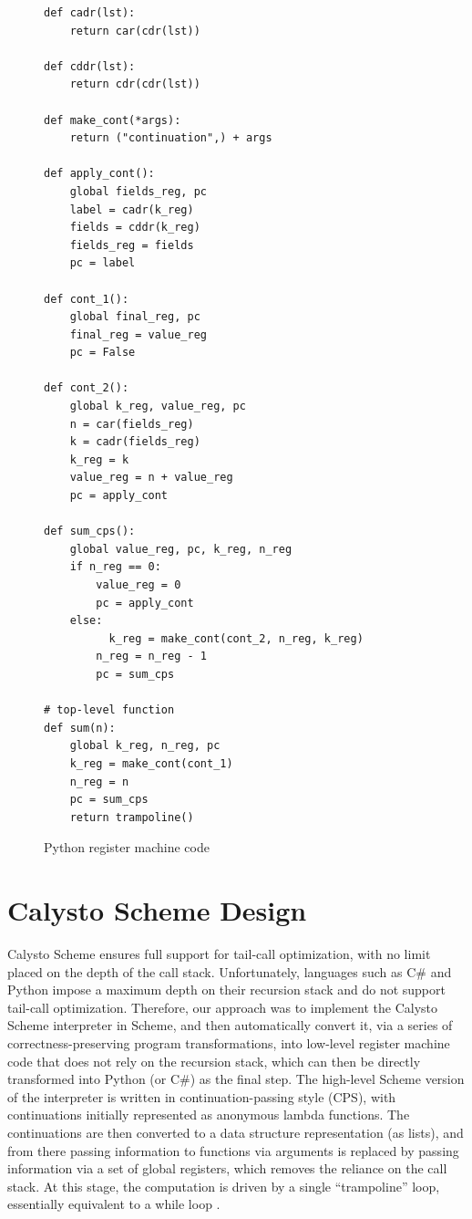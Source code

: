 \documentclass[acmsmall,screen,authorversion]{acmart}
\begin{document}
\begin{figure}
\begin{minipage}{0.4\textwidth}
{\begin{verbatim}
def cadr(lst):
    return car(cdr(lst))

def cddr(lst):
    return cdr(cdr(lst))

def make_cont(*args):
    return ("continuation",) + args

def apply_cont():
    global fields_reg, pc
    label = cadr(k_reg)
    fields = cddr(k_reg)
    fields_reg = fields
    pc = label

def cont_1():
    global final_reg, pc
    final_reg = value_reg
    pc = False

def cont_2():
    global k_reg, value_reg, pc
    n = car(fields_reg)
    k = cadr(fields_reg)
    k_reg = k
    value_reg = n + value_reg
    pc = apply_cont

def sum_cps():
    global value_reg, pc, k_reg, n_reg
    if n_reg == 0:
        value_reg = 0
        pc = apply_cont
    else:
          k_reg = make_cont(cont_2, n_reg, k_reg)
        n_reg = n_reg - 1
        pc = sum_cps

# top-level function
def sum(n):
    global k_reg, n_reg, pc
    k_reg = make_cont(cont_1)
    n_reg = n
    pc = sum_cps
    return trampoline()
\end{verbatim}
}
\caption{Python register machine code}
\label{fig:pythonRM}
\end{minipage}
\end{figure}


\section{Calysto Scheme Design}

Calysto Scheme ensures full support for tail-call optimization, with no limit
placed on the depth of the call stack.  Unfortunately, languages such as C\#
and Python impose a maximum depth on their recursion stack and do not support
tail-call optimization.  Therefore, our approach was to implement the Calysto
Scheme interpreter in Scheme, and then automatically convert it, via a series
of correctness-preserving program transformations, into low-level register
machine code that does not rely on the recursion stack, which can then be
directly transformed into Python (or C\#) as the final step.  The high-level
Scheme version of the interpreter is written in continuation-passing style
(CPS), with continuations initially represented as anonymous lambda functions.
The continuations are then converted to a data structure representation (as
lists), and from there passing information to functions via arguments is
replaced by passing information via a set of global registers, which removes
the reliance on the call stack.  At this stage, the computation is driven by a
single ``trampoline'' loop, essentially equivalent to a while loop
\cite{Ganz99, EOPL3}.
\end{document}
